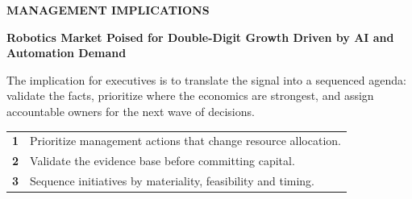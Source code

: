 \documentclass[10pt,a4paper]{article}
\begin{document}
\vspace{6pt}{\textcolor{BOBlue}{\scriptsize\bfseries STRATEGIC POSITIONING MAP}}\par
\begin{center}
\end{center}

\clearpage
{\textcolor{BOBlue}{\scriptsize\bfseries MANAGEMENT IMPLICATIONS}}\par\vspace{-1pt}
{\Large\sffamily\bfseries\color{BONavy} Robotics Market Poised for Double-Digit Growth Driven by AI and Automation Demand}\par\vspace{4pt}
{\small The implication for executives is to translate the signal into a sequenced agenda: validate the facts, prioritize where the economics are strongest, and assign accountable owners for the next wave of decisions.}\par
\begin{tabularx}{\linewidth}{p{10mm}Y}
\textcolor{BOBlue}{\bfseries 1} & Prioritize management actions that change resource allocation. \\[5pt]
\textcolor{BOBlue}{\bfseries 2} & Validate the evidence base before committing capital. \\[5pt]
\textcolor{BOBlue}{\bfseries 3} & Sequence initiatives by materiality, feasibility and timing. \\[5pt]
\end{tabularx}
\vspace{6pt}
\end{document}
